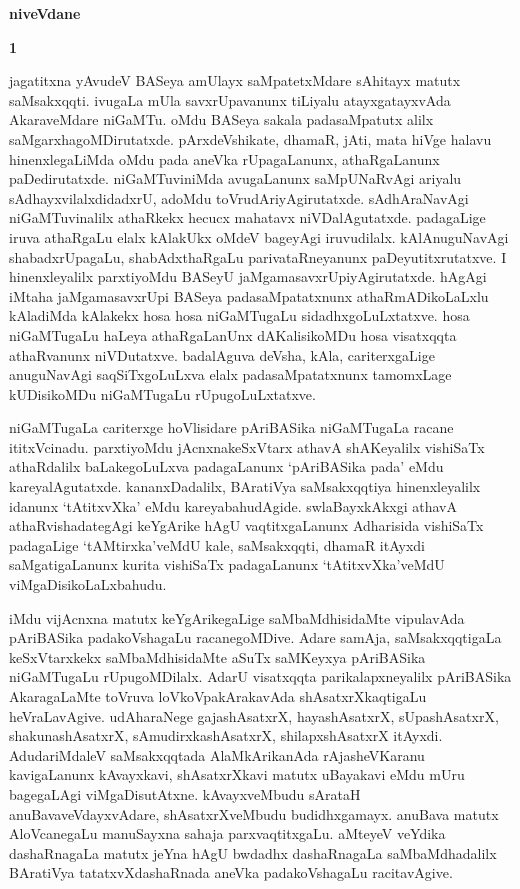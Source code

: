 \begin{center}
{\Huge\bfseries niveVdane}
\end{center}

\bigskip

\centerline{\large\bfseries 1}
\medskip

jagatitxna yAvudeV BASeya amUlayx saMpatetxMdare sAhitayx matutx saMsakxqqti. ivugaLa mUla savxrUpavanunx tiLiyalu atayxgatayxvAda AkaraveMdare niGaMTu. oMdu BASeya sakala padasaMpatutx alilx saMgarxhagoMDirutatxde. pArxdeVshikate, dhamaR, jAti, mata hiVge halavu hinenxlegaLiMda oMdu pada aneVka rUpagaLanunx, athaRgaLanunx paDedirutatxde. niGaMTuviniMda avugaLanunx saMpUNaRvAgi ariyalu sAdhayxvilalxdidadxrU, adoMdu toVrudAriyAgirutatxde. sAdhAraNavAgi niGaMTuvinalilx athaRkekx hecucx mahatavx niVDa\-lAgutatxde. padagaLige iruva athaRgaLu elalx kAlakUkx oMdeV bageyAgi iruvudilalx. kAlAnuguNavAgi shabadxrUpagaLu, shabAdxthaR\-gaLu parivataRneyanunx paDeyutitxrutatxve. I hinenxleyalilx parxtiyoMdu BASeyU jaMgamasavxrUpiyAgirutatxde. \hbox{hAgAgi} iMtaha jaMgamasavxrUpi BASeya padasaMpatatxnunx athaRmADikoLaLxlu kAladiMda kAlakekx hosa hosa niGaMTugaLu sidadhxgoLuLxtatxve. hosa niGaMTugaLu haLeya athaRgaLanUnx dAKalisikoMDu hosa visatxqqta athaRvanunx niVDutatxve. badalAguva deVsha, kAla, cariterxgaLige anuguNavAgi saqSiTxgoLuLxva elalx padasaMpatatxnunx tamomxLage kUDisikoMDu niGaMTugaLu rUpugoLuLxtatxve.

\medskip

niGaMTugaLa cariterxge hoVlisidare pAriBASika niGaMTugaLa racane ititxVcinadu. parxtiyoMdu jAcnxnakeSxVtarx athavA shAKeyalilx vishiSaTx athaRdalilx baLakegoLuLxva padagaLanunx `pAriBASika pada' eMdu kareyalAgutatxde. kananxDadalilx, BAratiVya saMsakxqqtiya hinenxle\-yalilx idanunx `tAtitxvXka' eMdu kareyabahudAgide. swlaBayxkAkxgi athavA athaRvishadategAgi keYgArike hAgU vaqtitxgaLanunx Adharisida vishiSaTx padagaLige `tAMtirxka'veMdU kale, saMsakxqqti, dhamaR itAyxdi saMgatigaLanunx kurita vishiSaTx padagaLanunx `tAtitxvXka'veMdU viMgaDisi\-koLaLxbahudu.

\medskip

iMdu vijAcnxna matutx keYgArikegaLige saMbaMdhisidaMte vipulavAda pAriBASika padakoVshagaLu racanegoMDive. Adare samAja, saMsakxqqtigaLa keSxVtarxkekx saMbaMdhisidaMte aSuTx saMKeyxya pAriBASika niGaMTugaLu rUpugoMDilalx. AdarU visatxqqta parikalapxneyalilx pAriBASika AkaragaLaMte toVruva loVkoVpakArakavAda shAsatxrXkaqtigaLu heVraLavAgive. udAharaNege gajashAsatxrX, hayashAsatxrX, sUpashAsatxrX, shakunashAsatxrX, sAmudirxkashAsatxrX, shilapxshAsatxrX itAyxdi. AdudariMdaleV saMsakxqqtada AlaMkArikanAda rAjasheVKaranu kavigaLanunx kAvayxkavi, shAsatxrXkavi matutx uBayakavi eMdu mUru bagegaLAgi viMgaDisutAtxne. kAvayxveMbudu sArataH anuBavaveVdayxvAdare, shAsatxrX\-veMbudu budidhx\-gamayx. anuBava matutx AloVcanegaLu manuSayxna sahaja parxvaqtitxgaLu. aMteyeV veYdika dashaRnagaLa matutx jeYna hAgU bwdadhx dashaRnagaLa saMbaMdhadalilx BAratiVya tatatxvXdashaRnada aneVka padakoVshagaLu racitavAgive.

